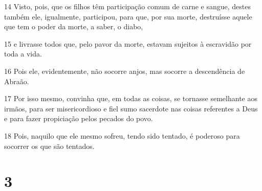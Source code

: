 \par 14 Visto, pois, que os filhos têm participação comum de carne e sangue, destes também ele, igualmente, participou, para que, por sua morte, destruísse aquele que tem o poder da morte, a saber, o diabo,
\par 15 e livrasse todos que, pelo pavor da morte, estavam sujeitos à escravidão por toda a vida.
\par 16 Pois ele, evidentemente, não socorre anjos, mas socorre a descendência de Abraão.
\par 17 Por isso mesmo, convinha que, em todas as coisas, se tornasse semelhante aos irmãos, para ser misericordioso e fiel sumo sacerdote nas coisas referentes a Deus e para fazer propiciação pelos pecados do povo.
\par 18 Pois, naquilo que ele mesmo sofreu, tendo sido tentado, é poderoso para socorrer os que são tentados.

\chapter{3}

